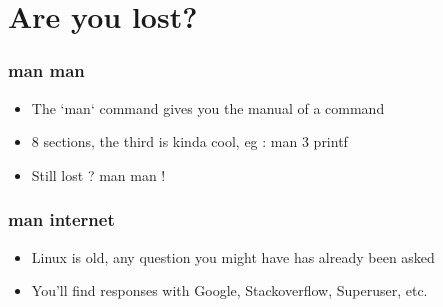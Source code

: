 \section{Are you lost?}


\begin{frame}
    \frametitle{man man}
    \begin{itemize}
	\item The `man` command gives you the manual of a command
	\item 8 sections, the third is kinda cool, eg : man 3 printf
	\item Still lost ? man man !
    \end{itemize}
\end{frame}

\begin{frame}
    \frametitle{man internet}
    \begin{itemize}
	\item Linux is old, any question you might have has already been asked
	\item You'll find responses with Google, Stackoverflow, Superuser, etc.
    \end{itemize}
\end{frame}

